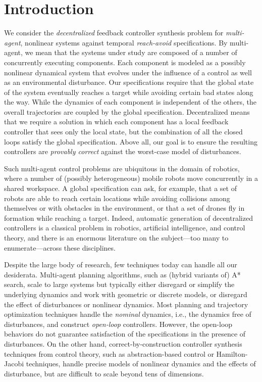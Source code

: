 
\section{Introduction}

We consider the \emph{decentralized} feedback controller synthesis problem for \emph{multi-agent}, nonlinear systems against temporal \emph{reach-avoid} specifications.
%
By multi-agent, we mean that the systems under study are composed of a number of concurrently executing components.
Each component is modeled as a possibly nonlinear dynamical system that evolves under the influence of a control as well as an environmental
disturbance.
Our specifications require that the global state of the system eventually reaches a target while avoiding certain bad states along the way.
While the dynamics of each component is independent of the others, the overall trajectories are coupled by the global specification.
Decentralized means that we require a solution in which each component has a local feedback controller that sees only the local
state, but the combination of all the closed loops satisfy the global specification.
Above all, our goal is to ensure the resulting controllers are \emph{provably correct} against the worst-case model of disturbances.

Such multi-agent control problems are ubiquitous in the domain of robotics, where a number of 
(possibly heterogeneous) mobile robots move concurrently in a shared workspace.
A global specification can ask, for example, that a set of robots are able to reach certain locations while avoiding collisions among themselves
or with obstacles in the environment,
or that a set of drones fly in formation while reaching a target.
Indeed, automatic generation of decentralized controllers is a classical problem in robotics, artificial intelligence, and control theory, 
and there is an enormous literature on the subject---too many to enumerate---across these disciplines.

Despite the large body of research, few techniques today can handle all our desiderata.
Multi-agent planning algorithms, such as (hybrid variants of) A* search, scale to large systems but typically either disregard or simplify the 
underlying dynamics and work with geometric or discrete models, or disregard the effect of disturbances or nonlinear dynamics.
Most planning and trajectory optimization techniques handle the \emph{nominal} dynamics, i.e., the dynamics free of disturbances,
and construct \emph{open-loop} controllers.
However, the open-loop behaviors do not guarantee satisfaction of the specifications in the presence of disturbances.
On the other hand, correct-by-construction controller synthesis techniques from control theory, 
such as abstraction-based control or Hamilton-Jacobi techniques,
handle precise models of nonlinear dynamics and the effects of disturbance, but are difficult to scale beyond tens of dimensions.

